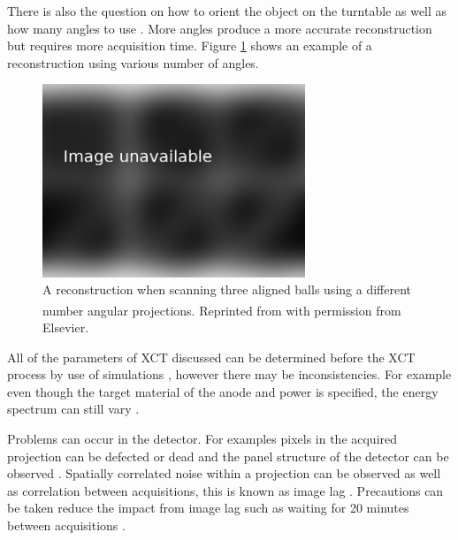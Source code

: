 There is also the question on how to orient the object on the turntable \citep{corcoran2016observations} as well as how many angles to use \citep{kruth2011computed}. More angles produce a more accurate reconstruction but requires more acquisition time. Figure \ref{fig:literature_angles} shows an example of a reconstruction using various number of angles.

\begin{figure}
  \centering
  \includegraphics[width=0.7\textwidth]{../figures/literatureReview/literature_angles.png}
  \caption{A reconstruction when scanning three aligned balls using a different number angular projections. Reprinted from \cite{kruth2011computed}\textsuperscript{\textcopyright} with permission from Elsevier.}
  \label{fig:literature_angles}
\end{figure}

All of the parameters of XCT discussed can be determined before the XCT process by use of simulations \citep{reisinger2011simulation, reiter2011simulation}, however there may be inconsistencies. For example even though the target material of the anode and power is specified, the energy spectrum can still vary \citep{stumbo2004direct}.

Problems can occur in the detector. For examples pixels in the acquired projection can be defected or dead \citep{brettschneider2014spatial} and the panel structure of the detector can be observed \citep{yang2009evaluation}. Spatially correlated noise within a projection can be observed \citep{sun2016characterisation} as well as correlation between acquisitions, this is known as image lag \citep{yang2009evaluation}. Precautions can be taken reduce the impact from image lag such as waiting for 20 minutes between acquisitions \citep{yang2010noise}.

